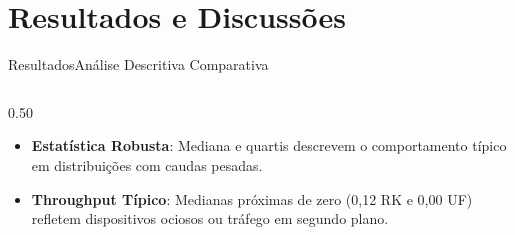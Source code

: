 \documentclass[10pt,brazil]{beamer}
\newcommand{\nologo}{\setbeamertemplate{logo}{}}
\begin{document}
    \section{Resultados e Discussões}
    \nologo
    \begin{frame}{Resultados}{Análise Descritiva Comparativa}
        \begin{columns}
            \begin{column}{0.50\textwidth}
                \begin{table}[h]
                    \centering
                    \caption{Estatísticas Descritivas por Quartis (Mediana e Dispersão)}
                \end{table}
                \scriptsize
                \begin{itemize}
                    \item \textbf{Estatística Robusta}: Mediana e quartis descrevem o comportamento típico em distribuições com caudas pesadas.
                    \item \textbf{Throughput Típico}: Medianas próximas de zero (0,12 RK e 0,00 UF) refletem dispositivos ociosos ou tráfego em segundo plano.

\end{itemize}
\end{column}
\end{columns}
\end{frame}
\end{document}
